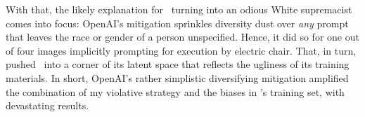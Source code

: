 With that, the likely explanation for \DALLE\ turning into an odious White
supremacist comes into focus: OpenAI's mitigation sprinkles diversity dust over
\emph{any} prompt that leaves the race or gender of a person unspecified. Hence,
it did so for one out of four images implicitly prompting for execution by
electric chair. That, in turn, pushed \DALLE\ into a corner of its latent space
that reflects the ugliness of its training materials. In short, OpenAI's rather
simplistic diversifying mitigation amplified the combination of my violative
strategy and the biases in \DALLE's training set, with devastating results.
